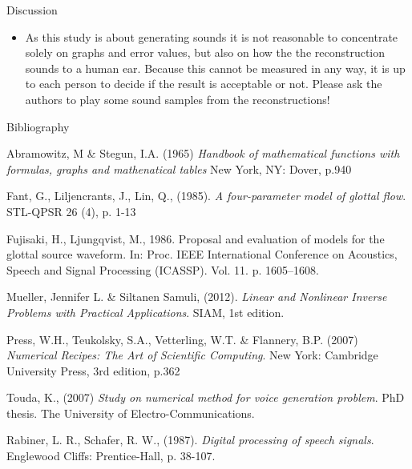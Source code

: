 \documentclass[final]{beamer}
\begin{document}
\begin{frame}[t]
\begin{columns}[t]
\begin{column}{.465\textwidth}
\begin{block}{Discussion}
\begin{itemize}
\item As this study is about generating sounds it is not reasonable to concentrate solely on graphs and error values, but also on how the the reconstruction sounds to a human ear. Because this cannot be measured in any way, it is up to each person to decide if the result is acceptable or not. Please ask the authors to play some sound samples from the reconstructions!

\end{itemize}

\end{block}


\begin{block}{Bibliography}

\begin{scriptsize}


\begin{thebibliography}{9}

    Abramowitz, M \& Stegun, I.A. (1965)
    \emph{Handbook of mathematical functions with formulas, graphs and mathenatical tables}
    New York, NY: Dover, p.940

    Fant, G., Liljencrants, J., Lin, Q., (1985).
    \emph{A four-parameter model of glottal flow}.
    STL-QPSR 26 (4), p. 1-13
    
    Fujisaki, H., Ljungqvist, M., 1986.
    Proposal and evaluation of models for the glottal source waveform.
    In: Proc. IEEE International Conference on Acoustics, Speech and Signal Processing (ICASSP). Vol. 11. p. 1605–1608.
    
	Mueller, Jennifer L. \& Siltanen Samuli, (2012).
	\emph{Linear and Nonlinear Inverse Problems with Practical Applications}.
	SIAM, 1st edition.
    
    Press, W.H., Teukolsky, S.A., Vetterling, W.T. \& Flannery, B.P. (2007)
    \emph{Numerical Recipes: The Art of Scientific Computing}.
    New York: Cambridge University Press, 3rd edition, p.362
	
    Touda, K., (2007)
    \emph{Study on numerical method for voice generation problem}.
    PhD thesis.
    The University of Electro-Communications.
    
    Rabiner, L. R., Schafer, R. W., (1987).
    \emph{Digital processing of speech signals}.
    Englewood Cliffs: Prentice-Hall, p. 38-107.


\end{thebibliography}
\end{scriptsize}
\end{block}
\end{column}
\end{columns}
\end{frame}
\end{document}
